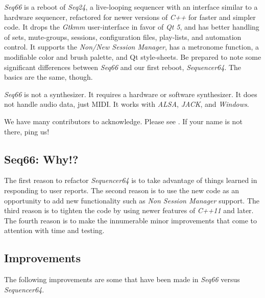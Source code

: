 \documentclass[
 11pt,
 twoside,
 a4paper,
 final                                 %
]{article}
\begin{document}
   \textsl{Seq66} is
   a reboot of \textsl{Seq24},
   a live-looping sequencer with an interface similar to a hardware sequencer,
   refactored for newer versions of
   \textsl{C++} for faster and simpler code.
   It drops the
   \textsl{Gtkmm} user-interface in favor of \textsl{Qt 5},
   and has better handling of sets, mute-groups, sessions, configuration files,
   play-lists, and automation control.
   It supports the \textsl{Non/New Session Manager},
   has a metronome function,
   a modifiable color and brush palette,
   and Qt style-sheets.
   Be prepared to note some significant differences
   between \textsl{Seq66} and our first reboot, \textsl{Sequencer64}.
   The basics are the same, though.

   \textsl{Seq66} is not a synthesizer.
   It requires a hardware or software synthesizer.
   It does not handle audio data, just MIDI.
   It works with \textsl{ALSA}, \textsl{JACK},
   and \textsl{Windows}.

   We have many contributors to acknowledge.
   Please see .
   If your name is not there, ping us!

\subsection{Seq66: Why!?}
\label{subsec:introduction_vs_others}

   The first reason to refactor \textsl{Sequencer64} is to take advantage of
   things learned in responding to user reports.  The second reason is to use
   the new code as an opportunity to add new functionality such as
   \textsl{Non Session Manager} support.  The third reason is to tighten the
   code by using newer features of \textsl{C++11} and later.
   The fourth reason is to make the innumerable minor improvements that come to
   attention with time and testing.

\subsection{Improvements}
\label{subsec:improvements}

   The following improvements are some that have been made in
   \textsl{Seq66} versus \textsl{Sequencer64}.
\end{document}
